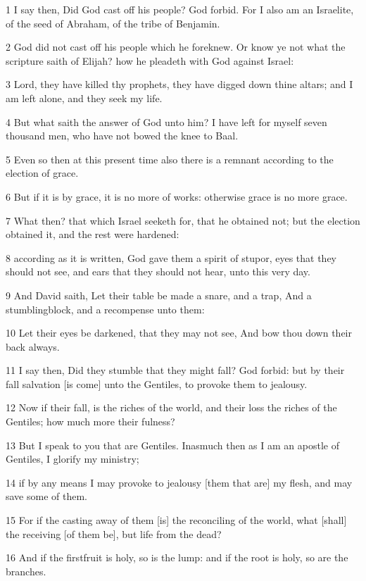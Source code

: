 \par 1 I say then, Did God cast off his people? God forbid. For I also am an Israelite, of the seed of Abraham, of the tribe of Benjamin.
\par 2 God did not cast off his people which he foreknew. Or know ye not what the scripture saith of Elijah? how he pleadeth with God against Israel:
\par 3 Lord, they have killed thy prophets, they have digged down thine altars; and I am left alone, and they seek my life.
\par 4 But what saith the answer of God unto him? I have left for myself seven thousand men, who have not bowed the knee to Baal.
\par 5 Even so then at this present time also there is a remnant according to the election of grace.
\par 6 But if it is by grace, it is no more of works: otherwise grace is no more grace.
\par 7 What then? that which Israel seeketh for, that he obtained not; but the election obtained it, and the rest were hardened:
\par 8 according as it is written, God gave them a spirit of stupor, eyes that they should not see, and ears that they should not hear, unto this very day.
\par 9 And David saith, Let their table be made a snare, and a trap, And a stumblingblock, and a recompense unto them:
\par 10 Let their eyes be darkened, that they may not see, And bow thou down their back always.
\par 11 I say then, Did they stumble that they might fall? God forbid: but by their fall salvation [is come] unto the Gentiles, to provoke them to jealousy.
\par 12 Now if their fall, is the riches of the world, and their loss the riches of the Gentiles; how much more their fulness?
\par 13 But I speak to you that are Gentiles. Inasmuch then as I am an apostle of Gentiles, I glorify my ministry;
\par 14 if by any means I may provoke to jealousy [them that are] my flesh, and may save some of them.
\par 15 For if the casting away of them [is] the reconciling of the world, what [shall] the receiving [of them be], but life from the dead?
\par 16 And if the firstfruit is holy, so is the lump: and if the root is holy, so are the branches.
